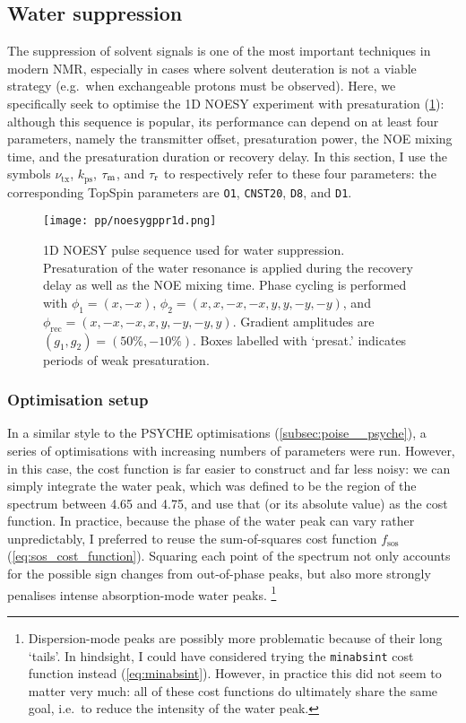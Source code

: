 \subsection{Water suppression}
\label{subsec:poise__solvsupp}

The suppression of solvent signals is one of the most important techniques in modern NMR, especially in cases where solvent deuteration is not a viable strategy (e.g.\ when exchangeable protons must be observed).\autocite{Zheng2010PNMRS,Giraudeau2015M}
Here, we specifically seek to optimise the 1D NOESY experiment with presaturation\autocite{Mckay2011CMR} (\cref{fig:poise_solvsupp_pulseq}): although this sequence is popular, its performance can depend on at least four parameters, namely the transmitter offset, presaturation power, the NOE mixing time, and the presaturation duration or recovery delay.
In this section, I use the symbols $\nu_\text{tx}$, $k_\text{ps}$, $\tau_\mathrm{m}$, and $\tau_\mathrm{r}$ to respectively refer to these four parameters: the corresponding TopSpin parameters are \texttt{O1}, \texttt{CNST20}, \texttt{D8}, and \texttt{D1}.

\begin{figure}[htb]
    \centering
    \texttt{[image: pp/noesygppr1d.png]}%
    \caption[1D NOESY pulse sequence for water suppression]{
        1D NOESY pulse sequence used for water suppression.
        Presaturation of the water resonance is applied during the recovery delay as well as the NOE mixing time.
        Phase cycling is performed with $\phi_1 = (x, -x)$, $\phi_2 = (x, x, -x, -x, y, y, -y, -y)$, and $\phi_\text{rec} = (x, -x, -x, x, y, -y, -y, y)$.
        Gradient amplitudes are $(g_1, g_2) = (50\%, -10\%)$.
        Boxes labelled with `presat.' indicates periods of weak presaturation.
    }
    \label{fig:poise_solvsupp_pulseq}
\end{figure}


\subsubsection{Optimisation setup}

In a similar style to the PSYCHE optimisations (\cref{subsec:poise__psyche}), a series of optimisations with increasing numbers of parameters were run.
However, in this case, the cost function is far easier to construct and far less noisy: we can simply integrate the water peak, which was defined to be the region of the spectrum between 4.65 and \qty{4.75}{\ppm}, and use that (or its absolute value) as the cost function.
In practice, because the phase of the water peak can vary rather unpredictably, I preferred to reuse the sum-of-squares cost function $f_\text{sos}$ (\cref{eq:sos_cost_function}).
Squaring each point of the spectrum not only accounts for the possible sign changes from out-of-phase peaks, but also more strongly penalises intense absorption-mode water peaks.%
\footnote{Dispersion-mode peaks are possibly more problematic because of their long `tails'. In hindsight, I could have considered trying the \texttt{minabsint} cost function instead (\cref{eq:minabsint}). However, in practice this did not seem to matter very much: all of these cost functions do ultimately share the same goal, i.e.\ to reduce the intensity of the water peak.}


